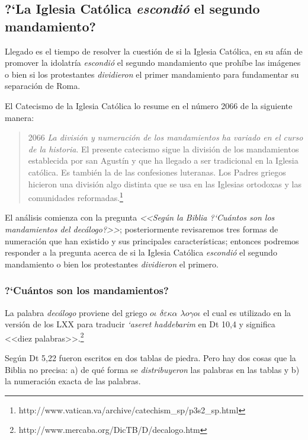 \documentclass{article}
\begin{document}
\subsection{?`La Iglesia Cat\'olica \emph{escondi\'o} el segundo mandamiento?}

Llegado es el tiempo de resolver la cuesti\'on de si la Iglesia Cat\'olica, en su af\'an de promover la idolatr\'{i}a \emph{escondi\'o} el segundo mandamiento que proh\'{i}be las im\'agenes o bien si los protestantes \emph{dividieron} el primer mandamiento para fundamentar su separaci\'on de Roma.

El Catecismo de la Iglesia Cat\'olica lo resume en el n\'umero 2066 de la siguiente manera:

\begin{quote}
2066 \emph{La división y numeración de los mandamientos ha variado en el curso de la historia}. El presente catecismo sigue la división de los mandamientos establecida por san Agustín y que ha llegado a ser tradicional en la Iglesia católica. Es también la de las confesiones luteranas. Los Padres griegos hicieron una división algo distinta que se usa en las Iglesias ortodoxas y las comunidades reformadas.\footnote{http://www.vatican.va/archive/catechism\_sp/p3s2\_sp.html}
\end{quote}

\noindent
El an\'alisis comienza con la pregunta \emph{<<Seg\'un la Biblia ?`Cu\'antos son los mandamientos del dec\'alogo?>>}; posteriormente revisaremos tres formas de numeraci\'on que han existido y sus principales caracter\'{i}sticas; entonces podremos responder a la pregunta acerca de si la Iglesia Cat\'olica \emph{escondi\'o} el segundo mandamiento o bien los protestantes \emph{dividieron} el primero.

\subsubsection{?`Cu\'antos son los mandamientos?}

La palabra \emph{dec\'alogo} proviene del griego \emph{$o \iota$ $ \delta\varepsilon\kappa\alpha$ $\lambda o \gamma o \iota$} el cual es utilizado en la versi\'on de los LXX para traducir \emph{{\lq}aseret haddebarim} en Dt 10,4 y significa <<diez palabras>>.\footnote{http://www.mercaba.org/DicTB/D/decalogo.htm}

Seg\'un Dt 5,22 fueron escritos en dos tablas de piedra. Pero hay dos cosas que la Biblia no precisa: a) de qu\'e forma se \emph{distribuyeron} las palabras en las tablas y b) la numeraci\'on exacta de las palabras.
\end{document}

